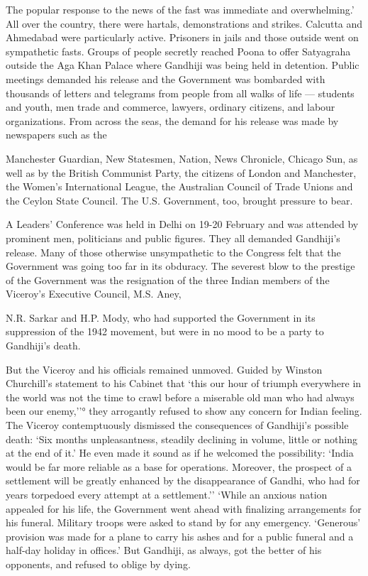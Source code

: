 The popular response to the news of the fast was immediate and overwhelming.' All over the country, there were hartals, demonstrations and strikes. Calcutta and Ahmedabad were particularly active. Prisoners in jails and those outside went on sympathetic fasts. Groups of people secretly reached Poona to offer Satyagraha outside the Aga Khan Palace where Gandhiji was being held in detention. Public meetings demanded his release and the Government was bombarded with thousands of letters and telegrams from people from all walks of life --- students and youth, men trade and commerce, lawyers, ordinary citizens, and labour organizations. From across the seas, the demand for his release was made by newspapers such as the

Manchester Guardian, New Statesmen, Nation, News Chronicle, Chicago Sun, as well as by the British Communist Party, the citizens of London and Manchester, the Women's International League, the Australian Council of Trade Unions and the Ceylon State Council. The U.S. Government, too, brought pressure to bear.

A Leaders' Conference was held in Delhi on 19-20 February and was attended by prominent men, politicians and public figures. They all demanded Gandhiji's release. Many of those otherwise unsympathetic to the Congress felt that the Government was going too far in its obduracy. The severest blow to the prestige of the Government was the resignation of the three Indian members of the Viceroy's Executive Council, M.S. Aney,

N.R. Sarkar and H.P. Mody, who had supported the Government in its suppression of the 1942 movement, but were in no mood to be a party to Gandhiji's death.

But the Viceroy and his officials remained unmoved. Guided by Winston Churchill's statement to his Cabinet that `this our hour of triumph everywhere in the world was not the time to crawl before a miserable old man who had always been our enemy,''° they arrogantly refused to show any concern for Indian feeling. The Viceroy contemptuously dismissed the consequences of Gandhiji's possible death: `Six months unpleasantness, steadily declining in volume, little or nothing at the end of it.' He even made it sound as if he welcomed the possibility: `India would be far more reliable as a base for operations. Moreover, the prospect of a settlement will be greatly enhanced by the disappearance of Gandhi, who had for years torpedoed every attempt at a settlement.'' `While an anxious nation appealed for his life, the Government went ahead with finalizing arrangements for his funeral. Military troops were asked to stand by for any emergency. `Generous' provision was made for a plane to carry his ashes and for a public funeral and a half-day holiday in offices.' But Gandhiji, as always, got the better of his opponents, and refused to oblige by dying.

